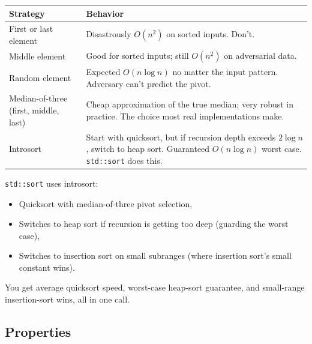 \documentclass[11pt]{article}
\begin{document}
\begin{center}
\footnotesize
\renewcommand{\arraystretch}{1.3}
\begin{tabular}{@{}p{3.2cm}p{9.2cm}@{}}
\hline
\textbf{Strategy} & \textbf{Behavior} \\
\hline
First or last element   & Disastrously $O(n^2)$ on sorted inputs. Don't. \\
Middle element          & Good for sorted inputs; still $O(n^2)$ on adversarial data. \\
Random element          & Expected $O(n \log n)$ no matter the input pattern.
                          Adversary can't predict the pivot. \\
Median-of-three (first, middle, last) & Cheap approximation of the
                          true median; very robust in practice. The
                          choice most real implementations make. \\
Introsort               & Start with quicksort, but if recursion depth
                          exceeds $2 \log n$, switch to heap sort.
                          Guaranteed $O(n \log n)$ worst case.
                          \texttt{std::sort} does this. \\
\hline
\end{tabular}
\end{center}

\begin{ideabox}
\texttt{std::sort} uses introsort:
\begin{itemize}[leftmargin=*]
  \item Quicksort with median-of-three pivot selection,
  \item Switches to heap sort if recursion is getting too deep
        (guarding the worst case),
  \item Switches to insertion sort on small subranges (where
        insertion sort's small constant wins).
\end{itemize}
You get average quicksort speed, worst-case heap-sort guarantee,
and small-range insertion-sort wins, all in one call.
\end{ideabox}

\subsection{Properties}
\end{document}
